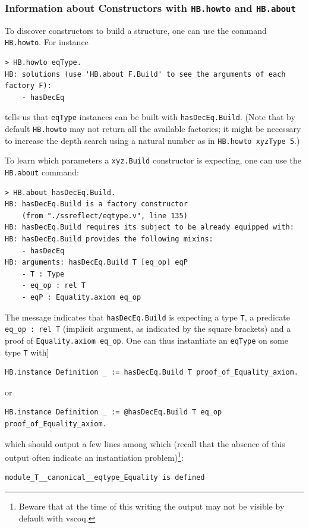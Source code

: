 \documentclass{article}
\def\coqin#1{\texttt{#1}}
\begin{document}
\subsubsection{Information about Constructors with \coqin{HB.howto} and \coqin{HB.about}}

To discover constructors to build a structure, one can use the command
\coqin{HB.howto}. For instance
\begin{verbatim}
> HB.howto eqType.
HB: solutions (use 'HB.about F.Build' to see the arguments of each factory F):
    - hasDecEq
\end{verbatim}
tells us that \coqin{eqType} instances can be built with \coqin{hasDecEq.Build}.
(Note that by default \coqin{HB.howto} may not return all the available factories;
it might be necessary to increase the depth search using a natural number
as in \coqin{HB.howto xyzType 5}.)

To learn which parameters a \coqin{xyz.Build} constructor is expecting, one
can use the \coqin{HB.about} command:
\begin{verbatim}
> HB.about hasDecEq.Build.
HB: hasDecEq.Build is a factory constructor
    (from "./ssreflect/eqtype.v", line 135)
HB: hasDecEq.Build requires its subject to be already equipped with:
HB: hasDecEq.Build provides the following mixins:
    - hasDecEq
HB: arguments: hasDecEq.Build T [eq_op] eqP
    - T : Type
    - eq_op : rel T
    - eqP : Equality.axiom eq_op
\end{verbatim}
The message indicates that \coqin{hasDecEq.Build} is expecting a type
\coqin{T}, a predicate \coqin{eq_op : rel T} (implicit argument,
as indicated by the square brackets) and a proof of \coqin{Equality.axiom eq_op}.
One can thus instantiate an \coqin{eqType} on some type \coqin{T} with]
\begin{verbatim}
HB.instance Definition _ := hasDecEq.Build T proof_of_Equality_axiom.
\end{verbatim}
or
\begin{verbatim}
HB.instance Definition _ := @hasDecEq.Build T eq_op proof_of_Equality_axiom.
\end{verbatim}
which should output a few lines among which (recall that the absence of this output
often indicate an instantiation problem)\footnote{Beware that at the time of this writing the output may not be visible
by default with vscoq.}:
\begin{verbatim}
module_T__canonical__eqtype_Equality is defined
\end{verbatim}
\end{document}

